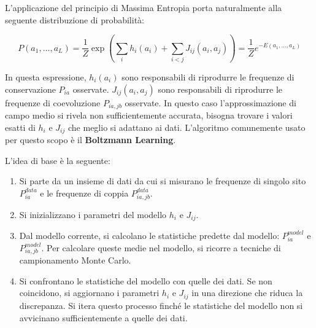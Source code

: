 L'applicazione del principio di Massima Entropia porta naturalmente alla seguente distribuzione di probabilità:

\begin{equation} \label{eq:ch25_9}
P(a_1, \dots, a_L) = \frac{1}{Z} \exp\left(\sum_i h_i(a_i) + \sum_{i<j} J_{ij}(a_i, a_j)\right) = \frac{1}{Z} e^{-E(a_1,\dots,a_L)}
\end{equation}

In questa espressione, $h_i(a_i)$ sono responsabili di riprodurre le frequenze di conservazione $P_{ia}$ osservate. $J_{ij}(a_i, a_j)$ sono responsabili di riprodurre le frequenze di coevoluzione $P_{ia,jb}$ osservate.
In questo caso l'approssimazione di campo medio si rivela non sufficientemente accurata, bisogna trovare i valori esatti di $h_i$ e $J_{ij}$ che meglio si adattano ai dati. L'algoritmo comunemente usato per questo scopo è il \textbf{Boltzmann Learning}.

L'idea di base è la seguente:
\begin{enumerate}
    \item Si parte da un insieme di dati da cui si misurano le frequenze di singolo sito $P_{ia}^{data}$ e le frequenze di coppia $P_{ia,jb}^{data}$.
    \item Si inizializzano i parametri del modello $h_i$ e $J_{ij}$.
    \item Dal modello corrente, si calcolano le statistiche predette dal modello: $P_{ia}^{model}$ e $P_{ia,jb}^{model}$. Per calcolare queste medie nel modello, si ricorre a tecniche di campionamento Monte Carlo.
    \item Si confrontano le statistiche del modello con quelle dei dati. Se non coincidono, si aggiornano i parametri $h_i$ e $J_{ij}$ in una direzione che riduca la discrepanza. Si itera questo processo finché le statistiche del modello non si avvicinano sufficientemente a quelle dei dati.
\end{enumerate}


